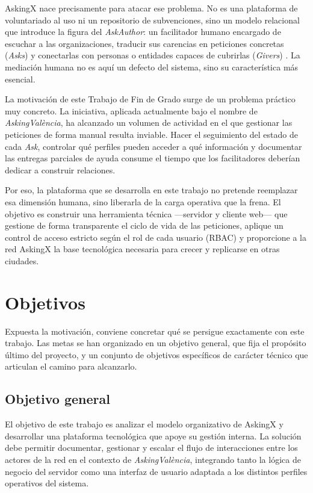 \documentclass[11pt,oneside,spanish,listoffigures,listoftables]{tfgetsinf}
\begin{document}
AskingX nace precisamente para atacar ese problema. No es una plataforma de voluntariado al uso ni un repositorio de subvenciones, sino un modelo relacional que introduce la figura del \textit{AskAuthor}: un facilitador humano encargado de escuchar a las organizaciones, traducir sus carencias en peticiones concretas (\textit{Asks}) y conectarlas con personas o entidades capaces de cubrirlas (\textit{Givers}) \cite{canos_manley_2024}. La mediación humana no es aquí un defecto del sistema, sino su característica más esencial.

La motivación de este Trabajo de Fin de Grado surge de un problema práctico muy concreto. La iniciativa, aplicada actualmente bajo el nombre de \textit{AskingValència}, ha alcanzado un volumen de actividad en el que gestionar las peticiones de forma manual resulta inviable. Hacer el seguimiento del estado de cada \textit{Ask}, controlar qué perfiles pueden acceder a qué información y documentar las entregas parciales de ayuda consume el tiempo que los facilitadores deberían dedicar a construir relaciones.

Por eso, la plataforma que se desarrolla en este trabajo no pretende reemplazar esa dimensión humana, sino liberarla de la carga operativa que la frena. El objetivo es construir una herramienta técnica —servidor y cliente web— que gestione de forma transparente el ciclo de vida de las peticiones, aplique un control de acceso estricto según el rol de cada usuario (RBAC) y proporcione a la red AskingX la base tecnológica necesaria para crecer y replicarse en otras ciudades.

\section{Objetivos}
Expuesta la motivación, conviene concretar qué se persigue exactamente con este trabajo. Las metas se han organizado en un objetivo general, que fija el propósito último del proyecto, y un conjunto de objetivos específicos de carácter técnico que articulan el camino para alcanzarlo.
\subsection{Objetivo general}
El objetivo de este trabajo es analizar el modelo organizativo de AskingX y desarrollar una plataforma tecnológica que apoye su gestión interna. La solución debe permitir documentar, gestionar y escalar el flujo de interacciones entre los actores de la red en el contexto de \textit{AskingValència}, integrando tanto la lógica de negocio del servidor como una interfaz de usuario adaptada a los distintos perfiles operativos del sistema.
\end{document}
